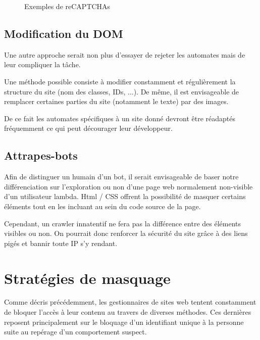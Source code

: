\documentclass[hideweeklyreports,noposter]{polytech/polytech}
\begin{document}
			\begin{figure}[H]
				\begin{minipage}{0.5\textwidth}
				\end{minipage}
				\begin{minipage}{0.49\textwidth}
				\end{minipage}
				\caption{Exemples de reCAPTCHAs}
			\end{figure}

		\section{Modification du DOM}
			Une autre approche serait non plus d'essayer de rejeter les automates mais de leur compliquer la tâche.
			
			Une méthode possible consiste à modifier constamment et régulièrement la structure du site (nom des classes, IDs, ...).
			De même, il est envisageable de remplacer certaines parties du site (notamment le texte) par des images.
			
			De ce fait les automates spécifiques à un site donné devront être réadaptés fréquemment ce qui peut décourager leur développeur.

        \section{Attrapes-bots}
            Afin de distinguer un humain d'un bot, il serait envisageable de baser notre différenciation sur l'exploration ou non d'une page web normalement non-visible d'un utilisateur lambda.
            Html / CSS offrent la possibilité de masquer certains éléments tout en les incluant au sein du code source de la page.
            
            Cependant, un crawler innatentif ne fera pas la différence entre des éléments visibles ou non.
            On pourrait donc renforcer la sécurité du site grâce à des liens pigés et bannir toute IP s'y rendant.

	\chapter{Stratégies de masquage}
		Comme décris précédemment, les gestionnaires de sites web tentent constamment de bloquer l'accès à leur contenu au travers de diverses méthodes.
		Ces dernières reposent principalement sur le bloquage d'un identifiant unique à la personne suite au repérage d'un comportement suspect.
		
\end{document}
